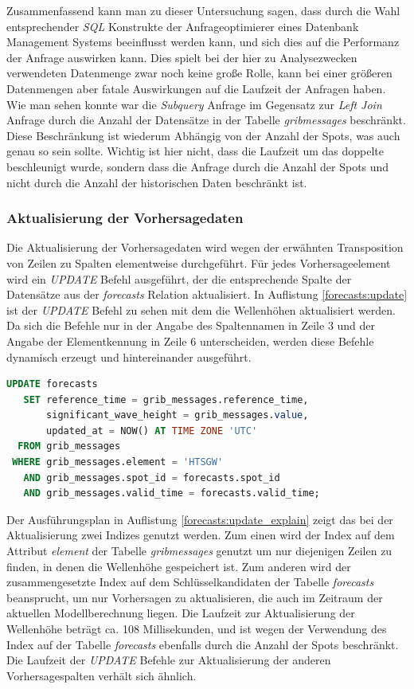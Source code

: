 Zusammenfassend kann man zu dieser Untersuchung sagen, dass durch die
Wahl entsprechender \textit{SQL} Konstrukte der Anfrageoptimierer
eines Datenbank Management Systems beeinflusst werden kann, und sich
dies auf die Performanz der Anfrage auswirken kann. Dies spielt bei
der hier zu Analysezwecken verwendeten Datenmenge zwar noch keine
große Rolle, kann bei einer größeren Datenmengen aber fatale
Auswirkungen auf die Laufzeit der Anfragen haben. Wie man sehen konnte
war die \textit{Subquery} Anfrage im Gegensatz zur \textit{Left Join}
Anfrage durch die Anzahl der Datensätze in der Tabelle
\textit{grib\textunderscore messages} beschränkt. Diese Beschränkung
ist wiederum Abhängig von der Anzahl der Spots, was auch genau so sein
sollte. Wichtig ist hier nicht, dass die Laufzeit um das doppelte
beschleunigt wurde, sondern dass die Anfrage durch die Anzahl der
Spots und nicht durch die Anzahl der historischen Daten beschränkt
ist.

\subsubsection{Aktualisierung der Vorhersagedaten}
Die Aktualisierung der Vorhersagedaten wird wegen der erwähnten
Transposition von Zeilen zu Spalten elementweise durchgeführt. Für
jedes Vorhersageelement wird ein \textit{UPDATE} Befehl ausgeführt,
der die entsprechende Spalte der Datensätze aus der \textit{forecasts}
Relation aktualisiert. In Auflistung \ref{forecasts:update} ist der
\textit{UPDATE} Befehl zu sehen mit dem die Wellenhöhen aktualisiert
werden. Da sich die Befehle nur in der Angabe des Spaltennamen in
Zeile 3 und der Angabe der Elementkennung in Zeile 6 unterscheiden,
werden diese Befehle dynamisch erzeugt und hintereinander ausgeführt.

\begin{lstlisting}[captionpos=b, caption=Aktualisierung der Wellenhöhe, label=forecasts:update, language=SQL]
UPDATE forecasts
   SET reference_time = grib_messages.reference_time,
       significant_wave_height = grib_messages.value,
       updated_at = NOW() AT TIME ZONE 'UTC'
  FROM grib_messages
 WHERE grib_messages.element = 'HTSGW'
   AND grib_messages.spot_id = forecasts.spot_id
   AND grib_messages.valid_time = forecasts.valid_time;
\end{lstlisting}

Der Ausführungsplan in Auflistung \ref{forecasts:update_explain} zeigt
das bei der Aktualisierung zwei Indizes genutzt werden. Zum einen wird
der Index auf dem Attribut \textit{element} der Tabelle
\textit{grib\textunderscore messages} genutzt um nur diejenigen Zeilen
zu finden, in denen die Wellenhöhe gespeichert ist. Zum anderen wird
der zusammengesetzte Index auf dem Schlüsselkandidaten der Tabelle
\textit{forecasts} beansprucht, um nur Vorhersagen zu aktualisieren,
die auch im Zeitraum der aktuellen Modellberechnung liegen. Die
Laufzeit zur Aktualisierung der Wellenhöhe beträgt ca. 108
Millisekunden, und ist wegen der Verwendung des Index auf der Tabelle
\textit{forecasts} ebenfalls durch die Anzahl der Spots
beschränkt. Die Laufzeit der \textit{UPDATE} Befehle zur
Aktualisierung der anderen Vorhersagespalten verhält sich ähnlich.

